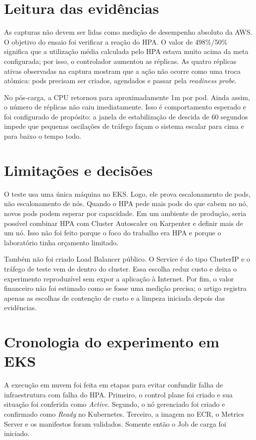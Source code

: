 \documentclass[conference]{IEEEtran}
\begin{document}
\section{Leitura das evidências}
As capturas não devem ser lidas como medição de desempenho absoluto da AWS. O objetivo do ensaio foi verificar a reação do HPA. O valor de 498\%/50\% significa que a utilização média calculada pelo HPA estava muito acima da meta configurada; por isso, o controlador aumentou as réplicas. As quatro réplicas ativas observadas na captura mostram que a ação não ocorre como uma troca atômica: pods precisam ser criados, agendados e passar pela \textit{readiness probe}.

No pós-carga, a CPU retornou para aproximadamente 1m por pod. Ainda assim, o número de réplicas não caiu imediatamente. Isso é comportamento esperado e foi configurado de propósito: a janela de estabilização de descida de 60 segundos impede que pequenas oscilações de tráfego façam o sistema escalar para cima e para baixo o tempo todo.

\section{Limitações e decisões}
O teste usa uma única máquina no EKS. Logo, ele prova escalonamento de pods, não escalonamento de nós. Quando o HPA pede mais pods do que cabem no nó, novos pods podem esperar por capacidade. Em um ambiente de produção, seria possível combinar HPA com Cluster Autoscaler ou Karpenter e definir mais de um nó. Isso não foi feito porque o foco do trabalho era HPA e porque o laboratório tinha orçamento limitado.

Também não foi criado Load Balancer público. O Service é do tipo ClusterIP e o tráfego de teste vem de dentro do cluster. Essa escolha reduz custo e deixa o experimento reproduzível sem expor a aplicação à Internet. Por fim, o valor financeiro não foi estimado como se fosse uma medição precisa; o artigo registra apenas as escolhas de contenção de custo e a limpeza iniciada depois das evidências.

\section{Cronologia do experimento em EKS}
A execução em nuvem foi feita em etapas para evitar confundir falha de infraestrutura com falha do HPA. Primeiro, o control plane foi criado e sua situação foi conferida como \textit{Active}. Segundo, o nó gerenciado foi criado e confirmado como \textit{Ready} no Kubernetes. Terceiro, a imagem no ECR, o Metrics Server e os manifestos foram validados. Somente então o Job de carga foi iniciado.
\end{document}
